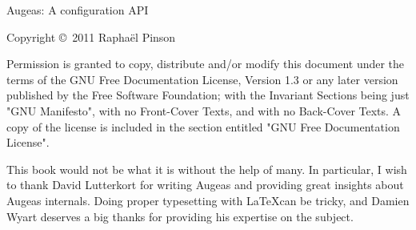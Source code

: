 \cleardoublepage
Augeas: A configuration API

Copyright \copyright~2011 Raphaël Pinson

Permission is granted to copy, distribute and/or modify this document under the terms of the GNU Free Documentation License, Version 1.3 or any later version published by the Free Software Foundation; with the Invariant Sections being just "GNU Manifesto", with no Front-Cover Texts, and with no Back-Cover Texts.  A copy of the license is included in the section entitled "GNU Free Documentation License".

This book would not be what it is without the help of many.
In particular, I wish to thank David Lutterkort for writing Augeas and providing great insights about Augeas internals.
Doing proper typesetting with \LaTeX can be tricky, and Damien Wyart deserves a big thanks for providing his expertise on the subject.


